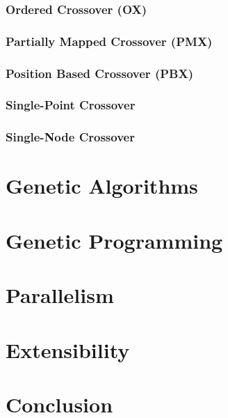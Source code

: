       \subsubsection{Ordered Crossover (OX)}
      \label{sec:keen:operators:crossover:ordered}
        \Blindtext
      \subsubsection{Partially Mapped Crossover (PMX)}
      \label{sec:keen:operators:crossover:partially_mapped}
        \Blindtext
      \subsubsection{Position Based Crossover (PBX)}
      \label{sec:keen:operators:crossover:position_based}
        \Blindtext
      \subsubsection{Single-Point Crossover}
      \label{sec:keen:operators:crossover:single_point}
        \Blindtext
      \subsubsection{Single-Node Crossover}
      \label{sec:keen:operators:crossover:single_node}
        \Blindtext
  \section{Genetic Algorithms}
  \label{sec:genetic_algorithms}
    \Blindtext
  \section{Genetic Programming}
  \label{sec:genetic_programming}
    \Blindtext
  \section{Parallelism}
  \label{sec:parallelism}
    \Blindtext
  \section{Extensibility}
  \label{sec:extensibility}
    \Blindtext
  \section{Conclusion}
  \label{sec:conclusion}
    \Blindtext

